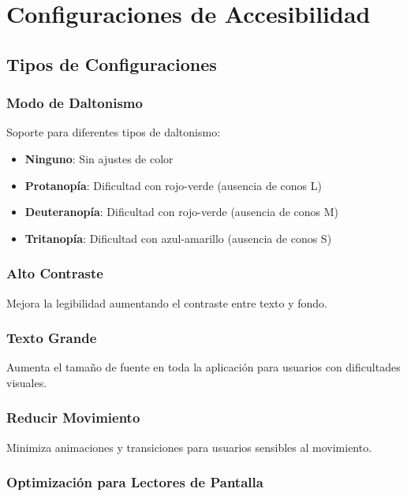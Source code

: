 \documentclass[12pt,a4paper]{article}
\begin{document}
\section{Configuraciones de Accesibilidad}

\subsection{Tipos de Configuraciones}

\subsubsection{Modo de Daltonismo}

Soporte para diferentes tipos de daltonismo:

\begin{itemize}
    \item \textbf{Ninguno}: Sin ajustes de color
    \item \textbf{Protanopía}: Dificultad con rojo-verde (ausencia de conos L)
    \item \textbf{Deuteranopía}: Dificultad con rojo-verde (ausencia de conos M)
    \item \textbf{Tritanopía}: Dificultad con azul-amarillo (ausencia de conos S)
\end{itemize}

\subsubsection{Alto Contraste}

Mejora la legibilidad aumentando el contraste entre texto y fondo.

\subsubsection{Texto Grande}

Aumenta el tamaño de fuente en toda la aplicación para usuarios con dificultades visuales.

\subsubsection{Reducir Movimiento}

Minimiza animaciones y transiciones para usuarios sensibles al movimiento.

\subsubsection{Optimización para Lectores de Pantalla}
\end{document}
